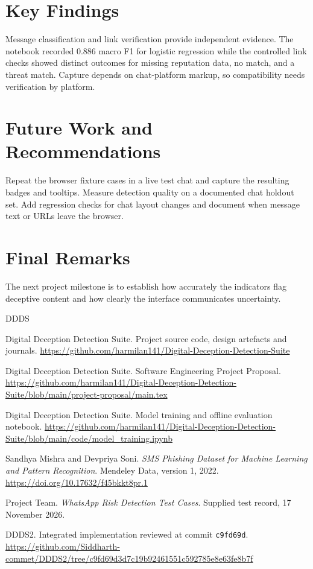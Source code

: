 \documentclass[12pt,letterpaper,twoside,openany]{book}
\newcommand{\DDDSRepo}{https://github.com/harmilan141/Digital-Deception-Detection-Suite}
\begin{document}
\section{Key Findings}

Message classification and link verification provide independent evidence. The notebook recorded 0.886 macro F1 for logistic regression while the controlled link checks showed distinct outcomes for missing reputation data, no match, and a threat match. Capture depends on chat-platform markup, so compatibility needs verification by platform.

\section{Future Work and Recommendations}

Repeat the browser fixture cases in a live test chat and capture the resulting badges and tooltips. Measure detection quality on a documented chat holdout set. Add regression checks for chat layout changes and document when message text or URLs leave the browser.

\section{Final Remarks}

The next project milestone is to establish how accurately the indicators flag deceptive content and how clearly the interface communicates uncertainty.

\clearpage
{}
{}
\begin{thebibliography}{DDDS}
\raggedright
{}
Digital Deception Detection Suite. Project source code, design artefacts and journals.
\newline\expandafter\url\expandafter{\DDDSRepo}

Digital Deception Detection Suite. Software Engineering Project Proposal.
\newline\url{https://github.com/harmilan141/Digital-Deception-Detection-Suite/blob/main/project-proposal/main.tex}

Digital Deception Detection Suite. Model training and offline evaluation notebook.
\newline\url{https://github.com/harmilan141/Digital-Deception-Detection-Suite/blob/main/code/model_training.ipynb}

Sandhya Mishra and Devpriya Soni. \textit{SMS Phishing Dataset for Machine Learning and Pattern Recognition}. Mendeley Data, version 1, 2022.
\newline\url{https://doi.org/10.17632/f45bkkt8pr.1}

Project Team. \textit{WhatsApp Risk Detection Test Cases}. Supplied test record, 17 November 2026.

DDDS2. Integrated implementation reviewed at commit \texttt{c9fd69d}.
\newline\url{https://github.com/Siddharth-commet/DDDS2/tree/c9fd69d3d7c19b92461551c592785e8e63fe8b7f}
\end{thebibliography}
\end{document}
